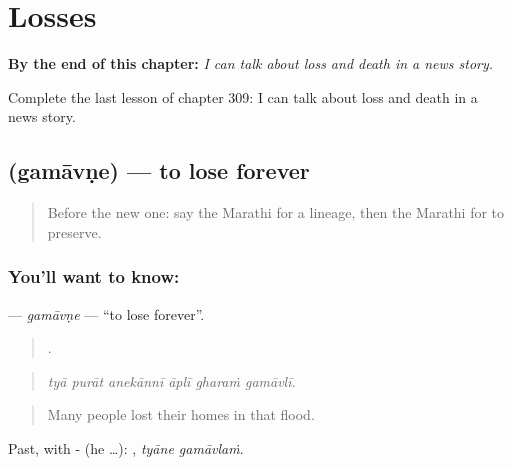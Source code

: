 
\chapter{Losses}
\label{ch:mr-losses}

\begin{chapteropening}
\textbf{By the end of this chapter:} \emph{I can talk about loss and death in a news story.}

Complete the last lesson of chapter 309: I can talk about loss and death in a news story.
\end{chapteropening}

\section[\texorpdfstring{\mr{गमावणे} (gamāvṇe)}{गमावणे (gamāvṇe)}]{ (gamāvṇe) — to lose forever}

\label{lesson:MR-C309-gamavne}



\begin{quote}
Before the new one: say the Marathi for a lineage, then the Marathi for to preserve.
\end{quote}

\subsection*{You'll want to know: }
\textbf{} — \emph{gamāvṇe} — \textquotedblleft{}to lose forever\textquotedblright{}.

\begin{quote}
     .
\end{quote}

\begin{quote}
\emph{tyā purāt anekānnī āplī gharaṁ gamāvlī.}
\end{quote}

\begin{quote}
Many people lost their homes in that flood.
\end{quote}

Past, with - (he …):  , \emph{tyāne gamāvlaṁ}.

